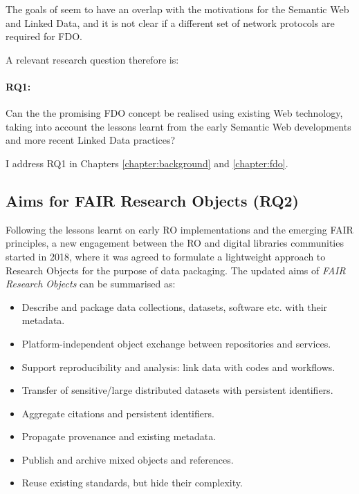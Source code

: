 The goals of  seem to have an overlap with the motivations for the Semantic Web and Linked Data, and it is not clear if a different set of network protocols are required for FDO.

A relevant research question therefore is: 

\paragraph{RQ1:}\label{rq1} 
Can the the promising FDO concept be realised using existing Web technology, taking into account the lessons learnt from the early Semantic Web developments and more recent Linked Data practices?

I address RQ1 in Chapters \ref{chapter:background} and \ref{chapter:fdo}.


\subsection{Aims for FAIR Research Objects (RQ2)}
\label{intro:rq2}

Following the lessons learnt on early \acrfull{RO} implementations and the emerging \acrshort{FAIR} principles, a new engagement between the RO and digital libraries communities started in 2018, where it was agreed to formulate a lightweight approach to Research Objects \cite{Sefton 2018,Ó Carragáin 2019b} for the purpose of data packaging. The updated aims of \emph{FAIR Research Objects} can be summarised as:
 
\begin{itemize}
    \item Describe and package data collections, datasets, software etc. with their metadata.
    \item Platform-independent object exchange between repositories and services.
    \item Support reproducibility and analysis: link data with codes and workflows.
    \item Transfer of sensitive/large distributed datasets with persistent identifiers.
    \item Aggregate citations and persistent identifiers.
    \item Propagate provenance and existing metadata.
    \item Publish and archive mixed objects and references.
    \item Reuse existing standards, but hide their complexity.
\end{itemize}

